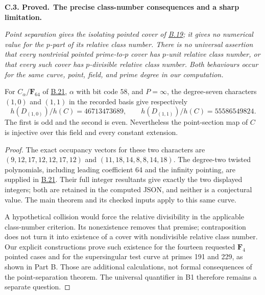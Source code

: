 \documentclass[11pt,a4paper]{article}
\newenvironment{claim}[3]{\par\medskip\noindent\hypertarget{#1}{\textbf{#1. #2.}}\ \textbf{#3.}\par\nopagebreak\smallskip\begingroup\itshape}{\endgroup\par\smallskip}
\newcommand{\statementref}[1]{\hyperlink{#1}{#1}}
\begin{document}
\begin{claim}{C.3}{Proved}{The precise class-number consequences and a sharp limitation}
Point separation gives the isolating pointed cover of
\statementref{B.19}; it gives no numerical value for the
$p$-part of its relative class number. There is no universal
assertion that every nontrivial pointed prime-to-$p$ cover has
$p$-unit relative class number, or that every such cover has
$p$-divisible relative class number. Both behaviours occur for
the same curve, point, field, and prime degree in our computation.

For $C_\alpha/\mathbf F_{64}$ of \statementref{B.21},
$\alpha$ with bit code $58$, and $P=\infty$, the degree-seven
characters $(1,0)$ and $(1,1)$ in the recorded basis give
respectively
\[
 h(D_{(1,0)})/h(C)=46713473689,\qquad
 h(D_{(1,1)})/h(C)=55586549824.
\]
The first is odd and the second is even. Nevertheless the
point-section map of $C$ is injective over this field and every
constant extension.
\end{claim}
\begin{proof}
The exact occupancy vectors for these two characters are
$(9,12,17,12,12,17,12)$ and $(11,18,14,8,8,14,18)$.
The degree-two twisted polynomials, including leading coefficient
64 and the infinity pointing, are supplied in
\statementref{B.21}. Their full integer resultants give exactly
the two displayed integers; both are retained in the computed
JSON, and neither is a conjectural value. The main theorem and
its checked inputs apply to this same curve.

A hypothetical collision would force the relative divisibility
in the applicable class-number criterion. Its nonexistence
removes that premise; contraposition does not turn it into
existence of a cover with nondivisible relative class number.
Our explicit constructions prove such existence for the
fourteen requested $\mathbf F_4$ pointed cases and for the
supersingular test curve at primes 191 and 229, as shown in
Part B. Those are additional calculations, not formal
consequences of the point-separation theorem. The universal
quantifier in B1 therefore remains a separate question.
\end{proof}
\end{document}
